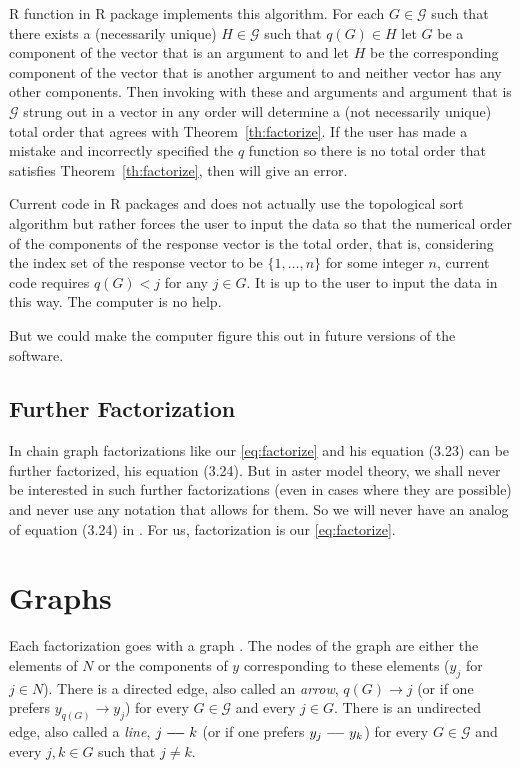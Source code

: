 R function  in R package 
\citep{pooh-package} implements this algorithm.
For each $G \in \mathcal{G}$ such that there exists
a (necessarily unique) $H \in \mathcal{G}$ such that $q(G) \in H$
let $G$ be a component of the vector  that is an argument to
 and
let $H$ be the corresponding component of the vector  that is another
argument to  and
neither vector has any other components.  Then invoking  with
these  and  arguments and  argument that is
$\mathcal{G}$ strung out in a vector in any order
will determine a (not necessarily unique) total order that agrees with
Theorem~\ref{th:factorize}.  If the user has made a mistake and incorrectly
specified the $q$ function so there is no total order that satisfies
Theorem~\ref{th:factorize}, then  will give an error.

Current code in R packages  and  does not
actually use the topological sort algorithm but rather forces the user
to input the data so that the numerical order of the components of the
response vector is the total order, that is, considering the index set
of the response vector to be $\{1, \ldots, n\}$ for some integer $n$,
current code requires $q(G) < j$ for any $j \in G$.
It is up to the user to input the data in this way.  The computer is no help.

But we could make the computer figure this out in future versions of the
software.

\subsection{Further Factorization}
\label{sec:further-factorize}

In \citet{lauritzen} chain graph factorizations like our \eqref{eq:factorize}
and his equation (3.23) can be further factorized, his equation (3.24).
But in aster model theory, we shall never be interested in such further
factorizations (even in cases where they are possible) and never use any
notation that allows for them.  So we will never have an analog of equation
(3.24) in \citet{lauritzen}.  For us, factorization is our \eqref{eq:factorize}.

\section{Graphs}

Each factorization goes with a graph \citep[Section~3.2.3]{lauritzen}.
The nodes of the graph are either the elements of $N$ or the components
of $y$ corresponding to these elements ($y_j$ for $j \in N$).
There is a directed edge, also called an \emph{arrow},
$q(G) \longrightarrow j$ (or if one prefers $y_{q(G)} \longrightarrow y_j$)
for every $G \in \mathcal{G}$ and every $j \in G$.
There is an undirected edge, also called a \emph{line},
$j \myline k$ (or if one prefers $y_j \myline y_k$)
for every $G \in \mathcal{G}$ and every $j, k \in G$ such that $j \neq k$.

